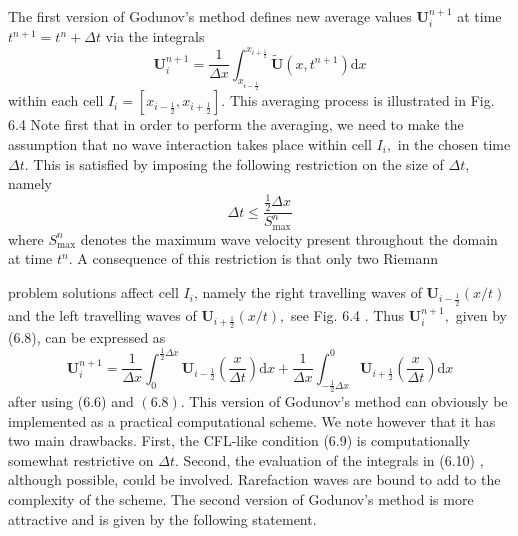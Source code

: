 The first version of Godunov's method defines new average values $\mathbf{U}_{i}^{n+1}$ at time $t^{n+1}=t^{n}+\Delta t$ via the integrals
$$
\mathbf{U}_{i}^{n+1}=\frac{1}{\Delta x} \int_{x_{i-\frac{1}{2}}}^{x_{i+\frac{1}{2}}} \widetilde{\mathbf{U}}\left(x, t^{n+1}\right) \mathrm{d} x
$$
within each cell $I_{i}=\left[x_{i-\frac{1}{2}}, x_{i+\frac{1}{2}}\right]$. This averaging process is illustrated in Fig. 6.4
Note first that in order to perform the averaging, we need to make the assumption that no wave interaction takes place within cell $I_{i},$ in the chosen time $\Delta t .$ This is satisfied by imposing the following restriction on the size of $\Delta t,$ namely
$$
\Delta t \leq \frac{\frac{1}{2} \Delta x}{S_{\max }^{n}}
$$
where $S_{\max }^{n}$ denotes the maximum wave velocity present throughout the domain at time $t^{n}$. A consequence of this restriction is that only two Riemann

problem solutions affect cell $I_{i}$, namely the right travelling waves of $\mathbf{U}_{i-\frac{1}{2}}(x / t)$ and the left travelling waves of $\mathbf{U}_{i+\frac{1}{2}}(x / t),$ see Fig. 6.4 . Thus $\mathbf{U}_{i}^{n+1},$ given by (6.8), can be expressed as
$$
\mathbf{U}_{i}^{n+1}=\frac{1}{\Delta x} \int_{0}^{\frac{1}{2} \Delta x} \mathbf{U}_{i-\frac{1}{2}}\left(\frac{x}{\Delta t}\right) \mathrm{d} x+\frac{1}{\Delta x} \int_{-\frac{1}{2} \Delta x}^{0} \mathbf{U}_{i+\frac{1}{2}}\left(\frac{x}{\Delta t}\right) \mathrm{d} x
$$
after using (6.6) and $(6.8) .$ This version of Godunov's method can obviously be implemented as a practical computational scheme. We note however that it has two main drawbacks. First, the CFL-like condition (6.9) is computationally somewhat restrictive on $\Delta t$. Second, the evaluation of the integrals in (6.10) , although possible, could be involved. Rarefaction waves are bound to add to the complexity of the scheme. The second version of Godunov's method is more attractive and is given by the following statement.

